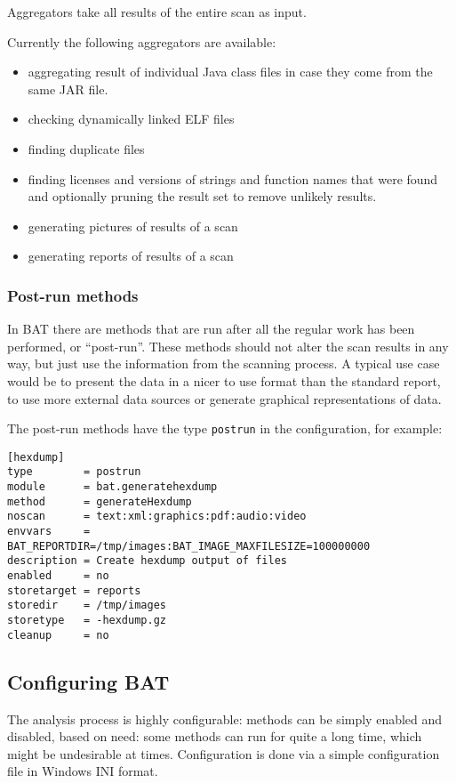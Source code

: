 \documentclass[10pt]{article}
\begin{document}
Aggregators take all results of the entire scan as input.

Currently the following aggregators are available:

\begin{itemize}
\item aggregating result of individual Java class files in case they come from
the same JAR file.
\item checking dynamically linked ELF files
\item finding duplicate files
\item finding licenses and versions of strings and function names that were
found and optionally pruning the result set to remove unlikely results.
\item generating pictures of results of a scan
\item generating reports of results of a scan
\end{itemize}

\subsubsection{Post-run methods}

In BAT there are methods that are run after all the regular work has been
performed, or ``post-run''. These methods should not alter the scan results in
any way, but just use the information from the scanning process. A typical use
case would be to present the data in a nicer to use format than the standard
report, to use more external data sources or generate graphical representations
of data.

The post-run methods have the type \texttt{postrun} in the configuration, for
example:

\begin{verbatim}
[hexdump]
type        = postrun
module      = bat.generatehexdump
method      = generateHexdump
noscan      = text:xml:graphics:pdf:audio:video
envvars     = BAT_REPORTDIR=/tmp/images:BAT_IMAGE_MAXFILESIZE=100000000
description = Create hexdump output of files
enabled     = no
storetarget = reports
storedir    = /tmp/images
storetype   = -hexdump.gz
cleanup     = no
\end{verbatim}

\subsection{Configuring BAT}

The analysis process is highly configurable: methods can be simply enabled and
disabled, based on need: some methods can run for quite a long time, which
might be undesirable at times. Configuration is done via a simple configuration
file in Windows INI format.
\end{document}
